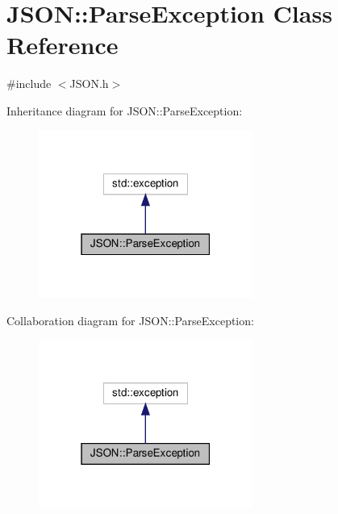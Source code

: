 \hypertarget{classJSON_1_1ParseException}{}\section{J\+S\+ON\+:\+:Parse\+Exception Class Reference}
\label{classJSON_1_1ParseException}


{\ttfamily \#include $<$J\+S\+O\+N.\+h$>$}



Inheritance diagram for J\+S\+ON\+:\+:Parse\+Exception\+:
\nopagebreak
\begin{figure}[H]
\begin{center}
\leavevmode
\includegraphics[width=199pt]{classJSON_1_1ParseException__inherit__graph}
\end{center}
\end{figure}


Collaboration diagram for J\+S\+ON\+:\+:Parse\+Exception\+:
\nopagebreak
\begin{figure}[H]
\begin{center}
\leavevmode
\includegraphics[width=199pt]{classJSON_1_1ParseException__coll__graph}
\end{center}
\end{figure}

